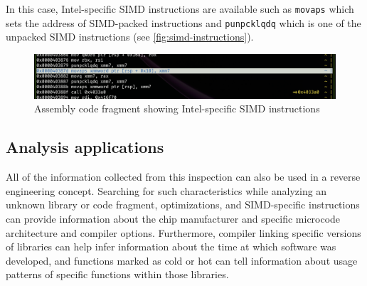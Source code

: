 In this case, Intel-specific SIMD instructions are available such as \verb|movaps| which sets the address of SIMD-packed instructions and \verb|punpcklqdq| which is one of the unpacked SIMD instructions \cite{intel_corporation_intel_2024} (see \autoref{fig:simd-instructions}).

\begin{figure}[h]
    \centering
    \includegraphics[width=1\linewidth]{arch-specific-instruction.png}
    \caption{Assembly code fragment showing Intel-specific SIMD instructions}
    \label{fig:simd-instructions}
\end{figure}

\subsection{Analysis applications}
All of the information collected from this inspection can also be used in a reverse engineering concept.
Searching for such characteristics while analyzing an unknown library or code fragment, optimizations, and SIMD-specific instructions can provide information about the chip manufacturer and specific microcode architecture and compiler options.
Furthermore, compiler linking specific versions of libraries can help infer information about the time at which software was developed, and functions marked as cold or hot can tell information about usage patterns of specific functions within those libraries.